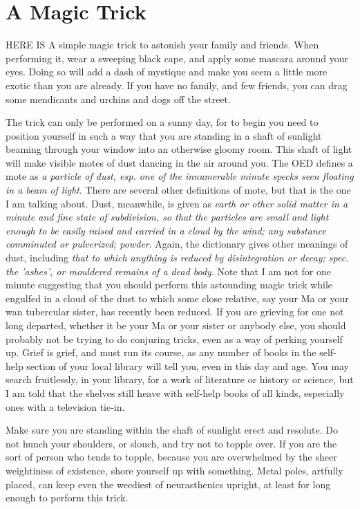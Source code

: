 \chapter{A Magic Trick}

HERE IS A simple magic trick to astonish your family and friends. When performing it, wear a sweeping black cape, and apply some mascara around your eyes. Doing so will add a dash of mystique and make you seem a little more exotic than you are already. If you have no family, and few friends, you can drag some mendicants and urchins and dogs off the street.

The trick can only be performed on a sunny day, for to begin you need to position yourself in such a way that you are standing in a shaft of sunlight beaming through your window into an otherwise gloomy room. This shaft of light will make visible motes of dust dancing in the air around you. The OED defines a mote as \emph{a particle of dust, esp. one of the innumerable minute specks seen floating in a beam of light}. There are several other definitions of mote, but that is the one I am talking about. Dust, meanwhile, is given as \emph{earth or other solid matter in a minute and fine state of subdivision, so that the particles are small and light enough to be easily raised and carried in a cloud by the wind; any substance comminuted or pulverized; powder}. Again, the dictionary gives other meanings of dust, including \emph{that to which anything is reduced by disintegration or decay; spec. the 'ashes', or mouldered remains of a dead body}. Note that I am not for one minute suggesting that you should perform this astounding magic trick while engulfed in a cloud of the dust to which some close relative, say your Ma or your wan tubercular sister, has recently been reduced. If you are grieving for one not long departed, whether it be your Ma or your sister or anybody else, you should probably not be trying to do conjuring tricks, even as a way of perking yourself up. Grief is grief, and must run its course, as any number of books in the self-help section of your local library will tell you, even in this day and age. You may search fruitlessly, in your library, for a work of literature or history or science, but I am told that the shelves still heave with self-help books of all kinds, especially ones with a television tie-in.

Make sure you are standing within the shaft of sunlight erect and resolute. Do not hunch your shoulders, or slouch, and try not to topple over. If you are the sort of person who tends to topple, because you are overwhelmed by the sheer weightiness of existence, shore yourself up with something. Metal poles, artfully placed, can keep even the weediest of neurasthenics upright, at least for long enough to perform this trick.


